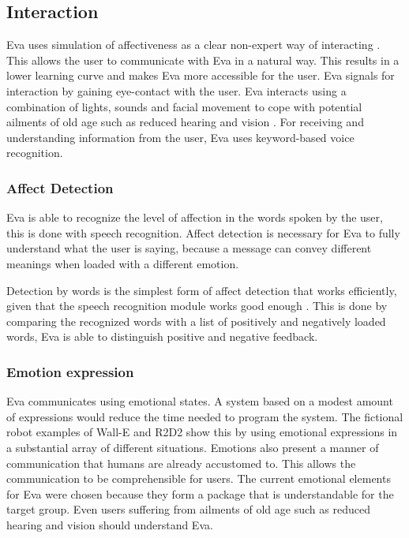 \documentclass[project_eva.tex]{subfiles}
\begin{document}
\subsection*{Interaction}
Eva uses simulation of affectiveness as a clear non-expert way of interacting \cite{Thomaz} . This allows the user to communicate with Eva in a natural way.  This results in a lower learning curve and makes Eva more accessible for the user. Eva signals for interaction by gaining eye-contact with the user. Eva interacts using a combination of lights, sounds and facial movement to cope with potential ailments of old age  such as reduced hearing and vision . For receiving and understanding information from the user, Eva uses keyword-based voice recognition. 

\subsubsection*{Affect Detection}
Eva is able to recognize the level of affection in the words spoken by the user, this is done with speech recognition. Affect detection is necessary for Eva to fully understand what the user is saying, because a message can convey different meanings when loaded with a different emotion.

Detection by words is the simplest form of affect detection that works efficiently, given that the speech recognition module works good enough \cite{affection} . This is done by comparing the recognized words with a list of positively and negatively loaded words, Eva is able to distinguish positive and negative feedback.
 
\subsubsection*{Emotion expression}
\label{sec:Emotion expression}
Eva communicates using emotional states. A system based on a modest amount of expressions would reduce the time needed 
to program the system. The fictional robot examples of Wall-E and R2D2 show this by using emotional expressions in a 
substantial array of different situations. Emotions also present a manner of communication that humans are already 
accustomed to. This allows the communication to be comprehensible for users. The current emotional elements for Eva were chosen because they form a package that is understandable for the target group. Even users suffering from ailments of old age such as reduced hearing and vision should understand Eva. 
\end{document}
